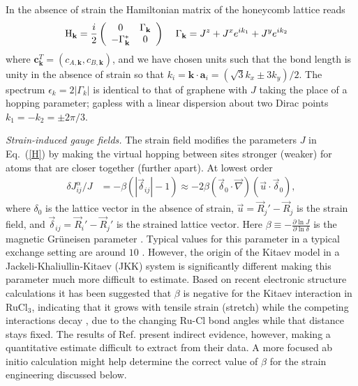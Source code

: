 \documentclass[reprint,amsmath,amssymb,aps,prl,groupedaddress,nofootinbib,superscriptaddress]{revtex4-1}
\newcommand{\1}{\mathds{1}}
\begin{document}
In the absence of strain the Hamiltonian matrix of the honeycomb lattice reads
\begin{align}
\mathrm{H}_{\mathbf k} &= \frac{i}{2} \left( \begin{array}{cc}\label{HCH}
0 & \Gamma_{\mathbf k} \\
-\Gamma_{\mathbf k}^* & 0 \\
\end{array} \right) \hspace{0.4cm}
\Gamma_{\mathbf k} = J^z + J^x e^{ik_1} + J^y e^{ik_2} 
\end{align} 
where $\mathbf{c}_{\mathbf k}^T = (c_{A,{\mathbf k}},c_{B,{\mathbf k} })$, and we have chosen units such that the bond length is unity in the absence of strain so that $k_i = {\mathbf k}\cdot{\mathbf a}_i = (\sqrt{3}k_x \pm 3k_y)/2$.
The spectrum $\epsilon_k = 2|\Gamma_k|$ is identical to that of graphene with $J$ taking the place of a hopping parameter; gapless with a linear dispersion about two Dirac points $k_1 = -k_2 = \pm 2\pi/3$. 

{\it Strain-induced gauge fields.}
The strain field modifies the parameters $J$ in Eq.~(\ref{H}) by making the virtual hopping between sites stronger (weaker) for atoms that are closer together (further apart). At lowest order \cite{Rachel15} 
\begin{align}
\delta J_{ij}^\alpha / J &= - \beta \left( |\vec{\delta}_{ij}| - 1 \right) \approx -2\beta (\vec{\delta}_0 \cdot \vec{\nabla})(\vec{u}\cdot \vec{\delta}_0) , %
\end{align}
where $\delta_0$ is the lattice vector in the absence of strain,  $\vec{u} = \vec{R}_j' - \vec{R}_j$ is the strain field, and $\vec{\delta}_{ij} = \vec{R}_i' - \vec{R}_j'$ is the strained lattice vector. Here $\beta \equiv -\frac{\partial \ln J}{\partial \ln \delta}$ is the magnetic Gr\"uneisen parameter \cite{White65}. Typical values for this parameter in a typical exchange setting are around $10$ \cite{Bloch66,Johnson74}. However, the origin of the Kitaev model in a Jackeli-Khaliullin-Kitaev (JKK) system \cite{Jackeli09} is significantly different making this parameter much more difficult to estimate. Based on recent electronic structure calculations it has been suggested that $\beta$ is negative for the Kitaev interaction in RuCl$_3$, indicating that it grows with tensile strain (stretch) while the competing interactions decay \cite{Kim16}, due to the changing Ru-Cl bond angles while that distance stays fixed. The results of Ref. \cite{Kim16} present indirect evidence, however, making a quantitative estimate difficult to extract from their data. A more focused ab initio calculation might help determine the correct value of $\beta$ for the strain engineering discussed below. 
\end{document}
